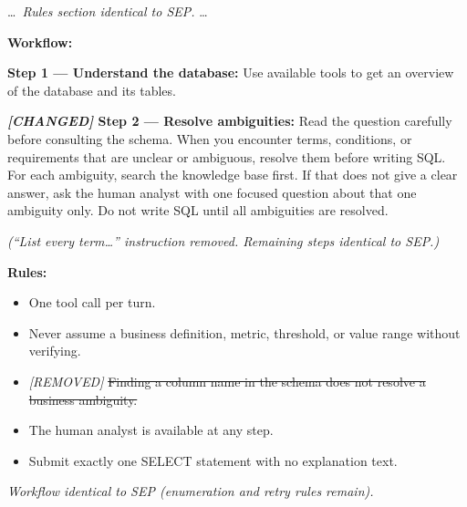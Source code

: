 \documentclass{article} %
\newcommand{\oursystem}{SEP} %
\begin{document}
\begin{tcolorbox}[promptbox, title={Abl-B --- No Explicit Listing (removes enumeration instruction from Step 2)}]
\small\ttfamily
\ldots\ \textit{Rules section identical to \oursystem{}.} \ldots

\medskip
\textbf{Workflow:}

\textbf{Step 1 --- Understand the database:}
Use available tools to get an overview of the database and its tables.

\textbf{\textit{[CHANGED]} Step 2 --- Resolve ambiguities:}
Read the question carefully before consulting the schema. When you encounter terms, conditions, or requirements that are unclear or ambiguous, resolve them before writing SQL. For each ambiguity, search the knowledge base first. If that does not give a clear answer, ask the human analyst with one focused question about that one ambiguity only. Do not write SQL until all ambiguities are resolved.

\textit{(``List every term\ldots'' instruction removed. Remaining steps identical to \oursystem{}.)}
\end{tcolorbox}

\begin{tcolorbox}[promptbox, title={Abl-C --- No Column$\neq$Ambiguity Rule (removes resolution path constraint from Rules)}]
\small\ttfamily
\textbf{Rules:}
\begin{itemize}[nosep, leftmargin=1.2em]
\item One tool call per turn.
\item Never assume a business definition, metric, threshold, or value range without verifying.
\item \textit{[REMOVED]} \sout{Finding a column name in the schema does not resolve a business ambiguity.}
\item The human analyst is available at any step.
\item Submit exactly one SELECT statement with no explanation text.
\end{itemize}

\textit{Workflow identical to \oursystem{} (enumeration and retry rules remain).}
\end{tcolorbox}
\end{document}
